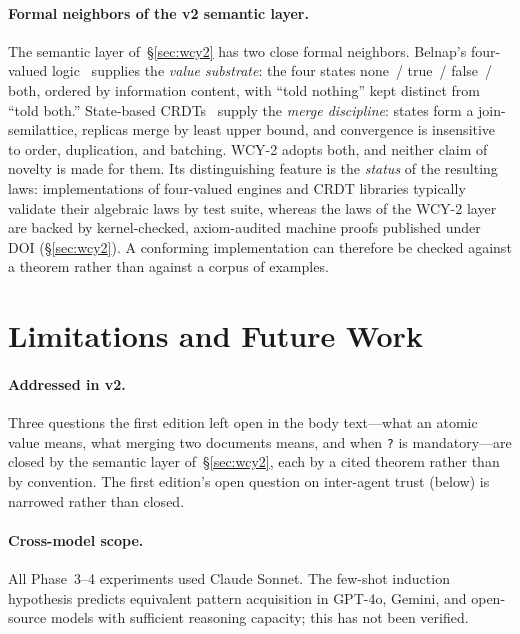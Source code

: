 \documentclass[11pt,a4paper]{article}
\begin{document}
\paragraph{Formal neighbors of the v2 semantic layer.}
The semantic layer of~\S\ref{sec:wcy2} has two close formal neighbors. Belnap's four-valued logic~\citep{belnap1977useful} supplies the \emph{value substrate}: the four states none~/ true~/ false~/ both, ordered by information content, with ``told nothing'' kept distinct from ``told both.'' State-based CRDTs~\citep{shapiro2011crdt} supply the \emph{merge discipline}: states form a join-semilattice, replicas merge by least upper bound, and convergence is insensitive to order, duplication, and batching. WCY-2 adopts both, and neither claim of novelty is made for them. Its distinguishing feature is the \emph{status} of the resulting laws: implementations of four-valued engines and CRDT libraries typically validate their algebraic laws by test suite, whereas the laws of the WCY-2 layer are backed by kernel-checked, axiom-audited machine proofs published under DOI (\S\ref{sec:wcy2}). A conforming implementation can therefore be checked against a theorem rather than against a corpus of examples.

\section{Limitations and Future Work}
\label{sec:limitations}

\paragraph{Addressed in v2.} Three questions the first edition left open in the body text---what an atomic value means, what merging two documents means, and when \texttt{?} is mandatory---are closed by the semantic layer of~\S\ref{sec:wcy2}, each by a cited theorem rather than by convention. The first edition's open question on inter-agent trust (below) is narrowed rather than closed.

\paragraph{Cross-model scope.} All Phase~3--4 experiments used Claude Sonnet. The few-shot induction hypothesis predicts equivalent pattern acquisition in GPT-4o, Gemini, and open-source models with sufficient reasoning capacity; this has not been verified.
\end{document}
